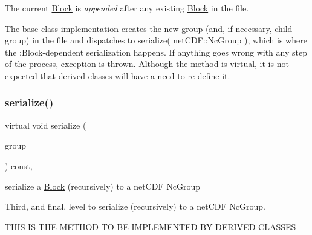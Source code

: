 The current \mbox{\hyperlink{class_s_m_spp__di__unipi__it_1_1_block}{Block}} is {\itshape appended} after any existing \mbox{\hyperlink{class_s_m_spp__di__unipi__it_1_1_block}{Block}} in the file.

The base class implementation creates the new group (and, if necessary, child group) in the file and dispatches to serialize( net\+C\+D\+F\+::\+Nc\+Group ), which is where the \+:Block-\/dependent serialization happens. If anything goes wrong with any step of the process, exception is thrown. Although the method is virtual, it is not expected that derived classes will have a need to re-\/define it. \mbox{\label{class_s_m_spp__di__unipi__it_1_1_block_a59f3f59d72c56028f06c555bdcd36caf}} 
\subsubsection{\texorpdfstring{serialize()}{serialize()}\hspace{0.1cm}{\footnotesize\ttfamily [3/3]}}
{\footnotesize\ttfamily virtual void serialize (\begin{DoxyParamCaption}\item[{net\+C\+D\+F\+::\+Nc\+Group \&\&}]{group }\end{DoxyParamCaption}) const\hspace{0.3cm}{\ttfamily [inline]}, {\ttfamily [virtual]}}



serialize a \mbox{\hyperlink{class_s_m_spp__di__unipi__it_1_1_block}{Block}} (recursively) to a net\+C\+DF Nc\+Group 

Third, and final, level to serialize (recursively) to a net\+C\+DF Nc\+Group. \begin{DoxyVerb}THIS IS THE METHOD TO BE IMPLEMENTED BY DERIVED CLASSES
\end{DoxyVerb}


